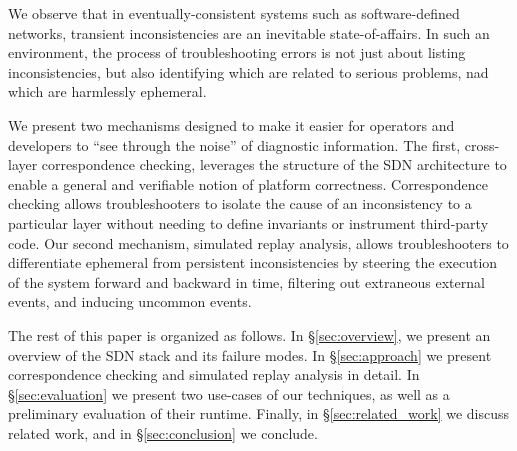 We observe that in eventually-consistent systems such as software-defined networks,
transient inconsistencies are an inevitable state-of-affairs.
In such an environment, the process of troubleshooting errors is not just
about listing inconsistencies, but also identifying which are related to
serious problems, nad which are harmlessly ephemeral.

We present two mechanisms designed to make it easier for operators and
developers to ``see through the noise'' of diagnostic information. The first,
cross-layer correspondence checking, leverages the structure of the SDN
architecture to enable a general and verifiable notion of platform
correctness. Correspondence checking allows troubleshooters to isolate the cause of 
an inconsistency to a particular layer without needing to define invariants or
instrument third-party code. Our second
mechanism, simulated replay analysis, allows troubleshooters 
to differentiate ephemeral from persistent inconsistencies by steering the
execution of the system forward and backward in time, filtering out extraneous
external events, and inducing uncommon events. 

The rest of this paper is organized as follows. In \S\ref{sec:overview},
we present an overview of the SDN stack and its failure modes.
In \S\ref{sec:approach} we present correspondence checking and simulated
replay analysis in detail. In \S\ref{sec:evaluation} we present
two use-cases of our techniques, as well as a preliminary evaluation
of their runtime. Finally, in \S\ref{sec:related_work} we discuss related work,
and in \S\ref{sec:conclusion} we conclude.
